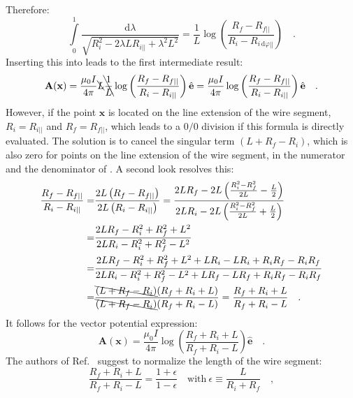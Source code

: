 Therefore:
\begin{equation}
 \int\limits_0^1 \frac{\mathrm{d}\lambda}{\sqrt{R_i^2 - 2 \lambda L R_{i ||} + \lambda^2 L^2}}
 = \frac{1}{L} \log \left( \frac{ R_f - R_{f ||} }{ R_i - R_{i  \,\mathrm{d}\varphi||} } \right) \quad .
\end{equation}
Inserting this into  leads to the first intermediate result:
\begin{equation}
   \mathbf{A}(\mathbf{x})
 = \frac{\mu_0 I}{4 \pi} \bcancel{L} \bcancel{\frac{1}{L}} \log \left( \frac{ R_f - R_{f ||} }{ R_i - R_{i ||} } \right) \hat{\mathbf{e}}
 = \frac{\mu_0 I}{4 \pi}                                   \log \left( \frac{ R_f - R_{f ||} }{ R_i - R_{i ||} } \right) \hat{\mathbf{e}} \quad . \label{eqn:A_first}
\end{equation}
However, if the point $\mathbf{x}$ is located on the line extension of the wire segment, $R_i = R_{i ||}$ and $R_f = R_{f ||}$,
which leads to a $0/0$ division if this formula is directly evaluated.
The solution is to cancel the singular term $(L + R_f - R_i)$, which is also zero for points on the line extension of the wire segment,
in the numerator and the denominator of .
A second look resolves this:
\begin{align}
\frac{ R_f - R_{f ||} }{ R_i - R_{i ||} }
 = & \frac{ 2 L \left( R_f - R_{f ||} \right) }{ 2 L \left( R_i - R_{i ||} \right) }
 =   \frac{ 2 L R_f - 2 L \left( \frac{R_i^2 - R_f^2}{2 L} - \frac{L}{2} \right) }{ 2 L R_i - 2 L \left( \frac{R_i^2 - R_f^2}{2 L} + \frac{L}{2} \right) } \\
 = & \frac{ 2 L R_f - R_i^2 + R_f^2 + L^2 }{ 2 L R_i - R_i^2 + R_f^2 - L^2 } \\
 = & \frac{ 2 L R_f - R_i^2 + R_f^2 + L^2 + L R_i - L R_i + R_i R_f - R_i R_f}{ 2 L R_i - R_i^2 + R_f^2 - L^2 + L R_f - L R_f + R_i R_f - R_i R_f } \\
 = & \frac{\bcancel{(L + R_f - R_i)}(R_f + R_i + L)}{\bcancel{(L + R_f - R_i)}(R_f + R_i - L)}
 =   \frac{R_f + R_i + L}{R_f + R_i - L} \quad .
\end{align}
It follows for the vector potential expression:
\begin{equation}
 \mathbf{A}(\mathbf{x}) = \frac{\mu_0 I}{4 \pi} \log \left( \frac{R_f + R_i + L}{R_f + R_i - L} \right) \hat{\mathbf{e}} \quad . \label{eqn:A_second}
\end{equation}
The authors of Ref.~\cite{hanson_hirshman_2002} suggest to normalize the length of the wire segment:
\begin{equation}
 \frac{R_f + R_i + L}{R_f + R_i - L} = \frac{1 + \epsilon}{1 - \epsilon} \quad \mathrm{with} ~ \epsilon \equiv \frac{L}{R_i + R_f} \quad ,
\end{equation}
